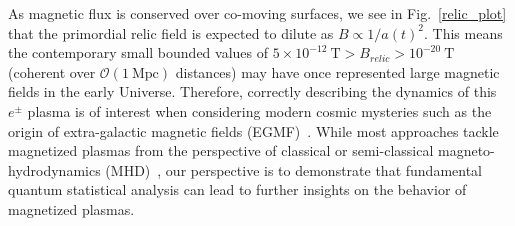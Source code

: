 \documentclass[universe,article,submit,moreauthors,pdftex,a4paper]{Definitions/mdpi}
\newcommand*{\rf}[1]{Fig.~{\ref{#1}}}
\begin{document}
As magnetic flux is conserved over co-moving surfaces, we see in \rf{relic_plot} that the primordial relic field is expected to dilute as $B\propto1/a(t)^{2}$. This means the contemporary small bounded values of $5\times10^{-12}\ \mathrm{T}>B_{relic}>10^{-20}\ \mathrm{T}$ (coherent over $\mathcal{O}(1\ \mathrm{Mpc})$ distances) may have once represented large magnetic fields in the early Universe. Therefore, correctly describing the dynamics of this $e^{\pm}$ plasma is of interest when considering modern cosmic mysteries such as the origin of extra-galactic magnetic fields (EGMF)~\cite{Anchordoqui:2001bs,Neronov:2010gir}. While most approaches tackle magnetized plasmas from the perspective of classical or semi-classical magneto-hydrodynamics (MHD)~\cite{berezhiani1992influence,berezhiani1995large,Schlickeiser:2018hzq}, our perspective is to demonstrate that fundamental quantum statistical analysis can lead to further insights on the behavior of magnetized plasmas.
\end{document}
